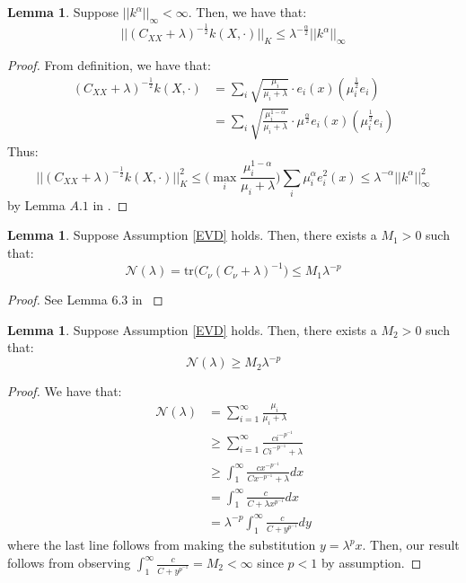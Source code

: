 \documentclass[accepted]{article}
\theoremstyle{definition}
\newtheorem{lemma}[theorem]{Lemma}
\begin{document}
\begin{lemma}
\label{EMB to h-bound}
Suppose $||k^{\alpha}||_{\infty}  < \infty$. Then, we have that:
\begin{equation*}
    ||(C_{XX} + \lambda)^{-\frac{1}{2}}k(X, \cdot)||_{K} \leq \lambda^{-\frac{\alpha}{2}}||k^{\alpha}||_{\infty}
\end{equation*}
\end{lemma}
\begin{proof}
From definition, we have that:
\begin{align*}
    (C_{XX} + \lambda)^{-\frac{1}{2}}k(X, \cdot) &= \sum_{i} \sqrt{\frac{\mu_i}{\mu_i + \lambda}} \cdot e_i(x)(\mu^{\frac{1}{2}}_ie_i) \\
    & = \sum_{i} \sqrt{\frac{\mu^{1 - \alpha}_i}{\mu_i + \lambda}} \cdot \mu^{\frac{\alpha}{2}}e_i(x)(\mu^{\frac{1}{2}}_ie_i) 
\end{align*}
Thus:
\begin{equation*}
    ||(C_{XX} + \lambda)^{-\frac{1}{2}}k(X, \cdot)||_{K}^2 \leq \Big(\max_{i} \frac{\mu^{1 - \alpha}_i}{\mu_i + \lambda}\Big) \sum_{i} \mu^{\alpha}_i e^2_i(x) \leq \lambda^{-\alpha}||k^{\alpha}||^{2}_{\infty}
\end{equation*}
by Lemma $A.1$ in \cite{fischer2020sobolev}. 
\end{proof}
\begin{lemma}
\label{Effective Dimension Bound}
Suppose Assumption \ref{EVD} holds. Then, there exists a $M_1 > 0$ such that:
\begin{equation*}
    \mathcal{N}(\lambda) = \text{tr}\Big(C_{\nu}(C_{\nu} + \lambda)^{-1}\Big) \leq M_1\lambda^{-p}
\end{equation*}
\end{lemma}
\begin{proof}
See Lemma 6.3 in \cite{fischer2020sobolev}
\end{proof}
\begin{lemma}
\label{Effective Dimension Lower Bound}
Suppose Assumption \ref{EVD} holds. Then, there exists a $M_2 > 0$ such that:
\begin{equation*}
    \mathcal{N}(\lambda) \geq M_2\lambda^{-p}
\end{equation*}
\end{lemma}
\begin{proof}
We have that:
\begin{align*}
    \mathcal{N}(\lambda) & = \sum_{i = 1}^{\infty} \frac{\mu_i}{\mu_i + \lambda} \\
    & \geq \sum_{i = 1}^{\infty} \frac{ci^{-p^{-1}}}{Ci^{-p^{-1}} + \lambda} \\
    & \geq \int_{1}^{\infty} \frac{cx^{-p^{-1}}}{Cx^{-p^{-1}} + \lambda} dx \\
    & = \int_{1}^{\infty} \frac{c}{C + \lambda x^{p^{-1}}} dx \\
    & = \lambda^{-p}\int_{1}^{\infty} \frac{c}{C + y^{p^{-1}}} dy
\end{align*}
where the last line follows from making the substitution $y = \lambda^p x$. Then, our result follows from observing $\int_{1}^{\infty} \frac{c}{C + y^{p^{-1}}} = M_2 < \infty$ since $p < 1$ by assumption.
\end{proof}
\end{document}
